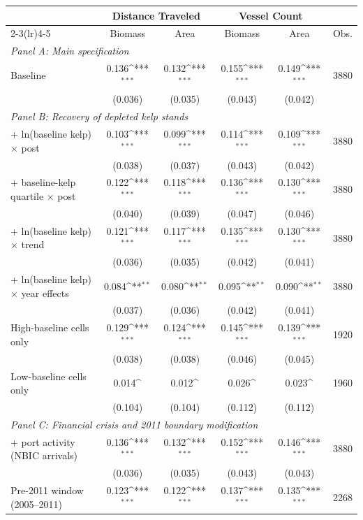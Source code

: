 \def\sym#1{\ifmmode^{#1}\else\(^{#1}\)\fi}
\begin{tabular}{l*{4}{c}c}
\hline\hline
 &\multicolumn{2}{c}{Distance Traveled}&\multicolumn{2}{c}{Vessel Count}&\\
\cmidrule(lr){2-3}\cmidrule(lr){4-5}
 &Biomass&Area&Biomass&Area&Obs.\\
\hline
\multicolumn{6}{l}{\emph{Panel A: Main specification}}\\
Baseline & 0.136\sym{***} & 0.132\sym{***} & 0.155\sym{***} & 0.149\sym{***} & 3880\\
 & (0.036) & (0.035) & (0.043) & (0.042) & \\
[0.4em]
\multicolumn{6}{l}{\emph{Panel B: Recovery of depleted kelp stands}}\\
+ ln(baseline kelp) $\times$ post & 0.103\sym{***} & 0.099\sym{***} & 0.114\sym{***} & 0.109\sym{***} & 3880\\
 & (0.038) & (0.037) & (0.043) & (0.042) & \\
+ baseline-kelp quartile $\times$ post & 0.122\sym{***} & 0.118\sym{***} & 0.136\sym{***} & 0.130\sym{***} & 3880\\
 & (0.040) & (0.039) & (0.047) & (0.046) & \\
+ ln(baseline kelp) $\times$ trend & 0.121\sym{***} & 0.117\sym{***} & 0.135\sym{***} & 0.130\sym{***} & 3880\\
 & (0.036) & (0.035) & (0.042) & (0.041) & \\
+ ln(baseline kelp) $\times$ year effects & 0.084\sym{**} & 0.080\sym{**} & 0.095\sym{**} & 0.090\sym{**} & 3880\\
 & (0.037) & (0.036) & (0.042) & (0.041) & \\
High-baseline cells only & 0.129\sym{***} & 0.124\sym{***} & 0.145\sym{***} & 0.139\sym{***} & 1920\\
 & (0.038) & (0.038) & (0.046) & (0.045) & \\
Low-baseline cells only & 0.014\sym{} & 0.012\sym{} & 0.026\sym{} & 0.023\sym{} & 1960\\
 & (0.104) & (0.104) & (0.112) & (0.112) & \\
[0.4em]
\multicolumn{6}{l}{\emph{Panel C: Financial crisis and 2011 boundary modification}}\\
+ port activity (NBIC arrivals) & 0.136\sym{***} & 0.132\sym{***} & 0.152\sym{***} & 0.146\sym{***} & 3880\\
 & (0.036) & (0.035) & (0.043) & (0.043) & \\
Pre-2011 window (2005--2011) & 0.123\sym{***} & 0.122\sym{***} & 0.137\sym{***} & 0.135\sym{***} & 2268\\

\end{tabular}

